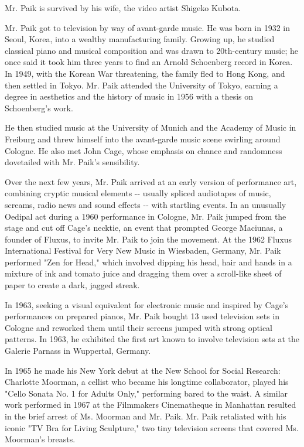 Mr. Paik is survived by his wife, the video artist Shigeko Kubota.

Mr. Paik got to television by way of avant-garde music. He was born in
1932 in Seoul, Korea, into a wealthy manufacturing family. Growing up,
he studied classical piano and musical composition and was drawn to
20th-century music; he once said it took him three years to find an
Arnold Schoenberg record in Korea. In 1949, with the Korean War
threatening, the family fled to Hong Kong, and then settled in Tokyo.
Mr. Paik attended the University of Tokyo, earning a degree in
aesthetics and the history of music in 1956 with a thesis on
Schoenberg's work.

He then studied music at the University of Munich and the Academy of
Music in Freiburg and threw himself into the avant-garde music scene
swirling around Cologne. He also met John Cage, whose emphasis on chance
and randomness dovetailed with Mr. Paik's sensibility.

Over the next few years, Mr. Paik arrived at an early version of
performance art, combining cryptic musical elements -\/- usually spliced
audiotapes of music, screams, radio news and sound effects -\/- with
startling events. In an unusually Oedipal act during a 1960 performance
in Cologne, Mr. Paik jumped from the stage and cut off Cage's necktie,
an event that prompted George Maciunas, a founder of Fluxus, to invite
Mr. Paik to join the movement. At the 1962 Fluxus International Festival
for Very New Music in Wiesbaden, Germany, Mr. Paik performed "Zen for
Head," which involved dipping his head, hair and hands in a mixture of
ink and tomato juice and dragging them over a scroll-like sheet of paper
to create a dark, jagged streak.

In 1963, seeking a visual equivalent for electronic music and inspired
by Cage's performances on prepared pianos, Mr. Paik bought 13 used
television sets in Cologne and reworked them until their screens jumped
with strong optical patterns. In 1963, he exhibited the first art known
to involve television sets at the Galerie Parnass in Wuppertal, Germany.

In 1965 he made his New York debut at the New School for Social
Research: Charlotte Moorman, a cellist who became his longtime
collaborator, played his "Cello Sonata No. 1 for Adults Only,"
performing bared to the waist. A similar work performed in 1967 at the
Filmmakers Cinematheque in Manhattan resulted in the brief arrest of Ms.
Moorman and Mr. Paik. Mr. Paik retaliated with his iconic "TV Bra for
Living Sculpture," two tiny television screens that covered Ms.
Moorman's breasts.

